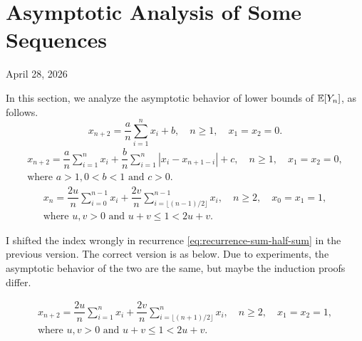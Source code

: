 \chapter{Asymptotic Analysis of Some Sequences}\label{chap:sequences}
\begin{center}
  April 28, 2026
  \vspace{0.5cm}
\end{center}

In this section, we analyze the asymptotic behavior of lower bounds of $\mathbb{E}[Y_n]$, as follows.
\begin{equation}
  \label{eq:recurrence-sum}
  x_{n+2} = \dfrac{a}{n}\sum_{i=1}^{n}x_i + b, \quad n \ge 1, \quad x_1=x_2=0.
\end{equation}
\begin{equation}
  \label{eq:recurrence-diff}
  \begin{aligned}
    x_{n+2} = \dfrac{a}{n}\sum_{i=1}^{n}x_i + \dfrac{b}{n}\sum_{i=1}^{n}|x_i - x_{n+1-i}| + c, \quad n \ge 1, \quad x_1=x_2=0, \\
    \text{where } a>1, 0 < b < 1 \text{ and } c>0.
  \end{aligned}
\end{equation}
\begin{equation}
  \label{eq:recurrence-sum-half-sum}
  \begin{aligned}
    x_{n} = \dfrac{2u}{n}\sum_{i=0}^{n-1}x_i + \dfrac{2v}{n}\sum_{i=\lfloor (n-1)/2 \rfloor}^{n-1}x_{i}, \quad n \ge 2, \quad  x_0=x_1=1, \\
    \text{where } u,v > 0 \text{ and } u+v\le1 < 2u+v.
  \end{aligned}
\end{equation}

\begin{note}
  I shifted the index wrongly in recurrence \eqref{eq:recurrence-sum-half-sum} in the previous version. The correct version is as below. Due to experiments, the asymptotic behavior of the two are the same, but maybe the induction proofs differ.
\end{note}

\begin{equation}
  \label{eq:recurrence-sum-half-sum-corrected}
  \begin{aligned}
    x_{n+2} = \dfrac{2u}{n}\sum_{i=1}^{n}x_i + \dfrac{2v}{n}\sum_{i=\lfloor (n+1)/2 \rfloor}^{n}x_{i}, \quad n \ge 2, \quad  x_1=x_2=1, \\
    \text{where } u,v > 0 \text{ and } u+v\le1 < 2u+v.
  \end{aligned}
\end{equation}

